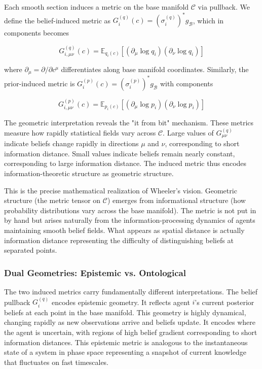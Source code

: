 \documentclass[11pt]{article}
\begin{document}
Each smooth section induces a metric on the base manifold $\mathcal{C}$ via pullback. We define the belief-induced metric as $G_i^{(q)}(c) = (\sigma_i^{(q)})^* g_{\mathcal{B}}$, which in components becomes

\begin{equation}
\boxed{G^{(q)}_{i,\mu\nu}(c) = \mathbb{E}_{q_i(c)}\left[(\partial_\mu \log q_i)(\partial_\nu \log q_i)\right]}
\end{equation}

where $\partial_\mu = \partial/\partial c^\mu$ differentiates along base manifold coordinates. Similarly, the prior-induced metric is $G_i^{(p)}(c) = (\sigma_i^{(p)})^* g_{\mathcal{B}}$ with components

\begin{equation}
\boxed{G^{(p)}_{i,\mu\nu}(c) = \mathbb{E}_{p_i(c)}\left[(\partial_\mu \log p_i)(\partial_\nu \log p_i)\right]}
\end{equation}

The geometric interpretation reveals the "it from bit" mechanism. These metrics measure how rapidly statistical fields vary across $\mathcal{C}$. Large values of $G^{(q)}_{\mu\nu}$ indicate beliefs change rapidly in directions $\mu$ and $\nu$, corresponding to short information distance. Small values indicate beliefs remain nearly constant, corresponding to large information distance. The induced metric thus encodes information-theoretic structure as geometric structure.

This is the precise mathematical realization of Wheeler's vision. Geometric structure (the metric tensor on $\mathcal{C}$) emerges from informational structure (how probability distributions vary across the base manifold). The metric is not put in by hand but arises naturally from the information-processing dynamics of agents maintaining smooth belief fields. What appears as spatial distance is actually information distance representing the difficulty of distinguishing beliefs at separated points.

\subsubsection{Dual Geometries: Epistemic vs. Ontological}

The two induced metrics carry fundamentally different interpretations. The belief pullback $G_i^{(q)}$ encodes epistemic geometry. It reflects agent $i$'s current posterior beliefs at each point in the base manifold. This geometry is highly dynamical, changing rapidly as new observations arrive and beliefs update. It encodes where the agent is uncertain, with regions of high belief gradient corresponding to short information distances. This epistemic metric is analogous to the instantaneous state of a system in phase space representing a snapshot of current knowledge that fluctuates on fast timescales.
\end{document}
